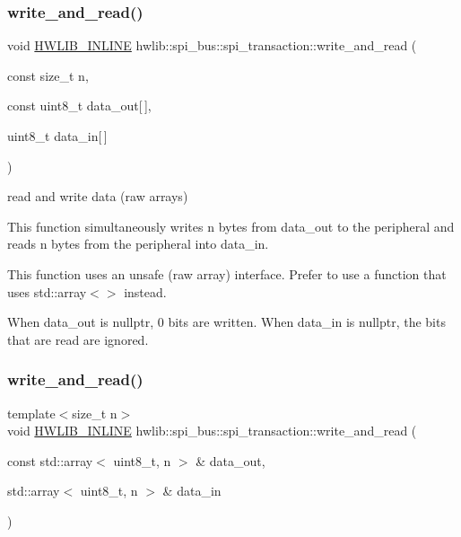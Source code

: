 \subsubsection{\texorpdfstring{write\+\_\+and\+\_\+read()}{write\_and\_read()}\hspace{0.1cm}{\footnotesize\ttfamily [1/2]}}
{\footnotesize\ttfamily void \hyperlink{hwlib-defines_8hpp_a520a8905adc71f1757aea4ce05183585}{H\+W\+L\+I\+B\+\_\+\+I\+N\+L\+I\+NE} hwlib\+::spi\+\_\+bus\+::spi\+\_\+transaction\+::write\+\_\+and\+\_\+read (\begin{DoxyParamCaption}\item[{const size\+\_\+t}]{n,  }\item[{const uint8\+\_\+t}]{data\+\_\+out\mbox{[}$\,$\mbox{]},  }\item[{uint8\+\_\+t}]{data\+\_\+in\mbox{[}$\,$\mbox{]} }\end{DoxyParamCaption})\hspace{0.3cm}{\ttfamily [inline]}}

read and write data (raw arrays)

This function simultaneously writes n bytes from data\+\_\+out to the peripheral and reads n bytes from the peripheral into data\+\_\+in.

This function uses an unsafe (raw array) interface. Prefer to use a function that uses std\+::array$<$$>$ instead.

When data\+\_\+out is nullptr, 0 bits are written. When data\+\_\+in is nullptr, the bits that are read are ignored. \mbox{\label{classhwlib_1_1spi__bus_1_1spi__transaction_ac80ff882385930ec4a85952a4a17f89e}} 
\subsubsection{\texorpdfstring{write\+\_\+and\+\_\+read()}{write\_and\_read()}\hspace{0.1cm}{\footnotesize\ttfamily [2/2]}}
{\footnotesize\ttfamily template$<$size\+\_\+t n$>$ \\
void \hyperlink{hwlib-defines_8hpp_a520a8905adc71f1757aea4ce05183585}{H\+W\+L\+I\+B\+\_\+\+I\+N\+L\+I\+NE} hwlib\+::spi\+\_\+bus\+::spi\+\_\+transaction\+::write\+\_\+and\+\_\+read (\begin{DoxyParamCaption}\item[{const std\+::array$<$ uint8\+\_\+t, n $>$ \&}]{data\+\_\+out,  }\item[{std\+::array$<$ uint8\+\_\+t, n $>$ \&}]{data\+\_\+in }\end{DoxyParamCaption})\hspace{0.3cm}{\ttfamily [inline]}}

